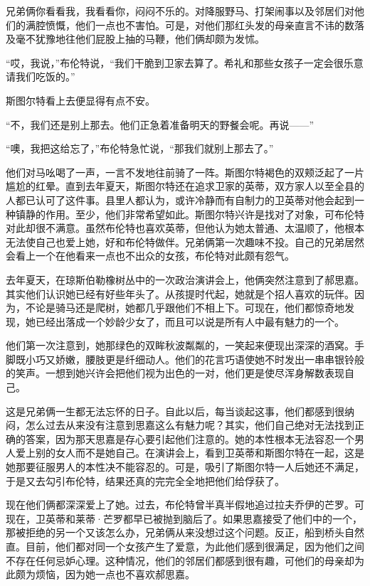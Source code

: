 \par 兄弟俩你看看我，我看看你，闷闷不乐的。对降服野马、打架闹事以及邻居们对他们的满腔愤慨，他们一点也不害怕。可是，对他们那红头发的母亲直言不讳的数落及毫不犹豫地往他们屁股上抽的马鞭，他们俩却颇为发怵。
\par “哎，我说，”布伦特说，“我们干脆到卫家去算了。希礼和那些女孩子一定会很乐意请我们吃饭的。”
\par 斯图尔特看上去便显得有点不安。
\par “不，我们还是别上那去。他们正急着准备明天的野餐会呢。再说——”
\par “噢，我把这给忘了，”布伦特急忙说，“那我们就别上那去了。”
\par 他们对马吆喝了一声，一言不发地往前骑了一阵。斯图尔特褐色的双颊泛起了一片尴尬的红晕。直到去年夏天，斯图尔特还在追求卫家的英蒂，双方家人以至全县的人都已认可了这件事。县里人都认为，或许冷静而有自制力的卫英蒂对他会起到一种镇静的作用。至少，他们非常希望如此。斯图尔特兴许是找对了对象，可布伦特对此却很不满意。虽然布伦特也喜欢英蒂，但他认为她太普通、太温顺了，他根本无法使自己也爱上她，好和布伦特做伴。兄弟俩第一次趣味不投。自己的兄弟居然会看上一个在他看来一点也不出众的女孩，布伦特对此颇有怨气。
\par 去年夏天，在琼斯伯勒橡树丛中的一次政治演讲会上，他俩突然注意到了郝思嘉。其实他们认识她已经有好些年头了。从孩提时代起，她就是个招人喜欢的玩伴。因为，不论是骑马还是爬树，她都几乎跟他们不相上下。可现在，他们都惊奇地发现，她已经出落成一个妙龄少女了，而且可以说是所有人中最有魅力的一个。
\par 他们第一次注意到，她那绿色的双眸秋波粼粼的，一笑起来便现出深深的酒窝。手脚既小巧又娇嫩，腰肢更是纤细动人。他们的花言巧语使她不时发出一串串银铃般的笑声。一想到她兴许会把他们视为出色的一对，他们更是使尽浑身解数表现自己。
\par 这是兄弟俩一生都无法忘怀的日子。自此以后，每当谈起这事，他们都感到很纳闷，怎么过去从来没有注意到思嘉这么有魅力呢？其实，他们自己绝对无法找到正确的答案，因为那天思嘉是存心要引起他们注意的。她的本性根本无法容忍一个男人爱上别的女人而不是她自己。在演讲会上，看到卫英蒂和斯图尔特在一起，这是她那要征服男人的本性决不能容忍的。可是，吸引了斯图尔特一人后她还不满足，于是又去勾引布伦特，结果还真的完完全全地把他们给俘获了。
\par 现在他们俩都深深爱上了她。过去，布伦特曾半真半假地追过拉夫乔伊的芒罗。可现在，卫英蒂和莱蒂·芒罗都早已被抛到脑后了。如果思嘉接受了他们中的一个，那被拒绝的另一个又该怎么办，兄弟俩从来没想过这个问题。反正，船到桥头自然直。目前，他们都对同一个女孩产生了爱意，为此他们感到很满足，因为他们之间不存在任何忌妒心理。这种情况，他们的邻居们都感到很有趣，可他们的母亲却为此颇为烦恼，因为她一点也不喜欢郝思嘉。
